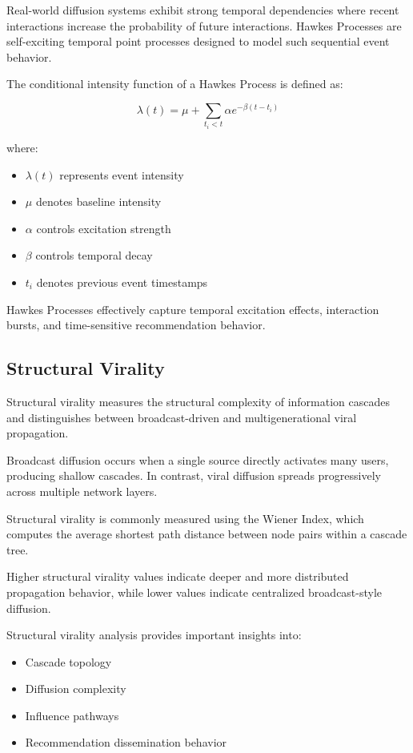 \documentclass{article}
\begin{document}
Real-world diffusion systems exhibit strong temporal dependencies where recent interactions increase the probability of future interactions. Hawkes Processes are self-exciting temporal point processes designed to model such sequential event behavior.

The conditional intensity function of a Hawkes Process is defined as:

\[
\lambda(t)=\mu+\sum_{t_i<t}\alpha e^{-\beta(t-t_i)}
\]

where:
\begin{itemize}
\item \(\lambda(t)\) represents event intensity
\item \(\mu\) denotes baseline intensity
\item \(\alpha\) controls excitation strength
\item \(\beta\) controls temporal decay
\item \(t_i\) denotes previous event timestamps
\end{itemize}

Hawkes Processes effectively capture temporal excitation effects, interaction bursts, and time-sensitive recommendation behavior.

\subsection{Structural Virality}

Structural virality measures the structural complexity of information cascades and distinguishes between broadcast-driven and multigenerational viral propagation.

Broadcast diffusion occurs when a single source directly activates many users, producing shallow cascades. In contrast, viral diffusion spreads progressively across multiple network layers.

Structural virality is commonly measured using the Wiener Index, which computes the average shortest path distance between node pairs within a cascade tree.

Higher structural virality values indicate deeper and more distributed propagation behavior, while lower values indicate centralized broadcast-style diffusion.

Structural virality analysis provides important insights into:
\begin{itemize}
\item Cascade topology
\item Diffusion complexity
\item Influence pathways
\item Recommendation dissemination behavior
\end{itemize}
\end{document}
